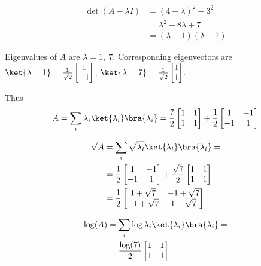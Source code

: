 \documentclass[a4paper,12pt]{article}
\begin{document}
\begin{align*}
	\det (A - \lambda I ) &= (4-\lambda)^2 - 3^2\\
		&= \lambda^2 -8\lambda + 7\\
		&= (\lambda - 1)(\lambda - 7)
\end{align*}

Eigenvalues of $A$ are $\lambda = 1, ~ 7$.
Corresponding eigenvectors are
$
	\ket{\lambda = 1} = \frac{1}{\sqrt{2}} \begin{bmatrix}
	1 \\
	-1
	\end{bmatrix}
$,
$
	\ket{\lambda = 7} = \frac{1}{\sqrt{2}} \begin{bmatrix}
1 \\
1
\end{bmatrix}
$.

Thus
\begin{align*}
	A = \sum_i \lambda_i \ket{\lambda_i}\bra{\lambda_i}= \frac{7}{2}
    \begin{bmatrix}
		1 & 1 \\
		1 & 1
    \end{bmatrix}+\frac{1}{2}
    \begin{bmatrix}
		1 & -1 \\
		-1 & 1
		\end{bmatrix}
  \end{align*}

\begin{align*}
	\sqrt{A} &= \sum_i \sqrt{\lambda_i}\ket{\lambda_i}\bra{\lambda_i}=\\
		&= \frac{1}{2} \begin{bmatrix}
		1 & -1 \\
		-1 & 1
		\end{bmatrix}
		+
		\frac{\sqrt{7}}{2} \begin{bmatrix}
		1 & 1 \\
		1 & 1
		\end{bmatrix}\\
		&=
		\frac{1}{2}
		 \begin{bmatrix}
			1+\sqrt{7} & -1+\sqrt{7} \\
			-1 + \sqrt{7} & 1+\sqrt{7}
		\end{bmatrix}
\end{align*}

 \begin{align*}
 	\log (A) &=  \sum_i \log\lambda_i \ket{\lambda_i}\bra{\lambda_i}=\\
 		&= \frac{\log (7)}{2} \begin{bmatrix}
	 		1 & 1 \\
	 		1 & 1
 		\end{bmatrix}
 \end{align*}
\end{document}

